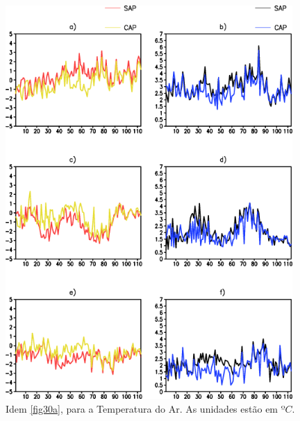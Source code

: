 \begin{figure}[!h]
\centering
\includegraphics[height=15cm]{./figs/vies_eqm-temp.png}
\caption{Idem \autoref{fig30a}, para a Temperatura do Ar. As unidades estão em $ºC$.}
\label{fig31a}
\end{figure}

\break

